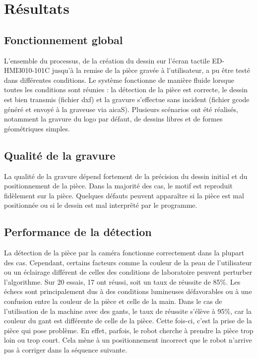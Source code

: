 \chapter{Résultats}

\section{Fonctionnement global}

L'ensemble du processus, de la création du dessin sur l'écran tactile \gls{ED-HMI3010-101C} jusqu'à la remise de la pièce gravée à l'utilisateur, a pu être testé dans différentes conditions. Le système fonctionne de manière fluide lorsque toutes les conditions sont réunies : la détection de la pièce est correcte, le dessin est bien transmis (fichier \gls{dxf}) et la gravure s'effectue sans incident (fichier \gls{gcode} généré et envoyé à la graveuse via \gls{aicaS}). Plusieurs scénarios ont été réalisés, notamment la gravure du logo par défaut, de dessins libres et de formes géométriques simples.

\section{Qualité de la gravure}

La qualité de la gravure dépend fortement de la précision du dessin initial et du positionnement de la pièce. Dans la majorité des cas, le motif est reproduit fidèlement sur la pièce. Quelques défauts peuvent apparaître si la pièce est mal positionnée ou si le dessin est mal interprêté par le programme.


\section{Performance de la détection}

La détection de la pièce par la caméra fonctionne correctement dans la plupart des cas. Cependant, certains facteurs comme la couleur de la peau de l'utilisateur ou un éclairage différent de celles des conditions de laboratoire peuvent perturber l'algorithme. Sur 20 essais, 17 ont réussi, soit un taux de réussite de 85\%. Les échecs sont principalement dus à des conditions lumineuses défavorables ou à une confusion entre la couleur de la pièce et celle de la main.
Dans le cas de l'utilisation de la machine avec des gants, le taux de réussite s'élève à 95\%, car la couleur du gant est différente de celle de la pièce. Cette fois-ci, c'est la prise de la pièce qui pose problème. En effet, parfois, le robot cherche à prendre la pièce trop loin ou trop court. Cela mène à un positionnement incorrect que le robot n'arrive pas à corriger dans la séquence suivante.

